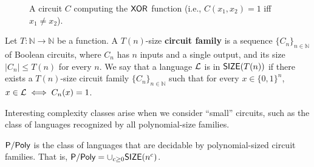 \begin{figure}[ht]
    \centering

    \caption{A circuit $C$ computing the $\mathsf{XOR}$ function (i.e., $C(x_1 , x_2 ) = 1$ iff $x_1 \neq x_2 $).}
\end{figure}

\begin{definition} 
    Let $T : \mathbb{N} \to \mathbb{N}$ be a function. 
    A $T(n)$-size \textbf{circuit family} is a sequence $\{C_n\}_{n\in\mathbb{N}}$ of Boolean circuits, where $C_n$ has $n$ inputs and a single output, and its size $|C_n| \leq T(n)$ for every $n$.
    We say that a language $\mathcal{L}$ is in $\mathsf{SIZE}(T(n))$ if there exists a $T(n)$-size circuit family $\{C_n\}_{n\in\mathbb{N}}$ such that for every $x\in\{0,1\}^n$, $x \in \mathcal{L} \iff C_n(x)=1$.
\end{definition}

Interesting complexity classes arise when we consider “small” circuits, such as the class of languages recognized by all polynomial-size families.


\begin{definition}[$\ppoly$]
    $\ppoly$ is the class of languages that are decidable by polynomial-sized circuit families.
    That is, $\mathsf{P/Poly} = \cup_{c\geq0} \mathsf{SIZE}(n^c)$.
\end{definition}

